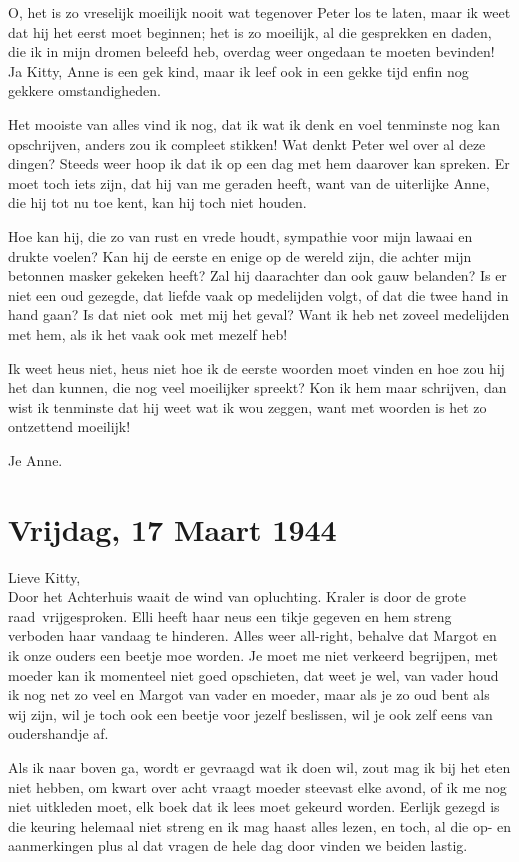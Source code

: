 \documentclass{book}
\begin{document}
O, het is zo vreselijk moeilijk nooit wat tegenover Peter los te laten, maar ik
weet dat hij het eerst moet beginnen; het is zo moeilijk, al die gesprekken en
daden, die ik in mijn dromen beleefd heb, overdag weer ongedaan te moeten
bevinden! Ja Kitty, Anne is een gek kind, maar ik leef ook in een gekke tijd
enfin nog gekkere omstandigheden.

Het mooiste van alles vind ik nog, dat ik wat ik denk en voel tenminste nog kan
opschrijven, anders zou ik compleet stikken! Wat denkt Peter wel over al deze
dingen? Steeds weer hoop ik dat ik op een dag met hem daarover kan spreken. Er
moet toch iets zijn, dat hij van me geraden heeft, want van de uiterlijke Anne,
die hij tot nu toe kent, kan hij toch niet houden.

Hoe kan hij, die zo van rust en vrede houdt, sympathie voor mijn lawaai en
drukte voelen? Kan hij de eerste en enige op de wereld zijn, die achter mijn
betonnen masker gekeken heeft? Zal hij daarachter dan ook gauw belanden? Is er
niet een oud gezegde, dat liefde vaak op medelijden volgt, of dat die twee hand
in hand gaan? Is dat niet ook~met mij het geval? Want ik heb net zoveel
medelijden met hem, als ik het vaak ook met mezelf heb!

Ik weet heus niet, heus niet hoe ik de eerste woorden moet vinden en hoe zou hij
het dan kunnen, die nog veel moeilijker spreekt? Kon ik hem maar schrijven, dan
wist ik tenminste dat hij weet wat ik wou zeggen, want met woorden is het zo
ontzettend moeilijk!

Je Anne.

\section*{Vrijdag, 17 Maart 1944}

Lieve Kitty,\\
Door het Achterhuis waait de wind van opluchting. Kraler is door
de grote raad~vrijgesproken. Elli heeft haar neus een tikje gegeven en hem
streng verboden haar vandaag te hinderen. Alles weer all-right, behalve dat
Margot en ik onze ouders een beetje moe worden.  Je moet me niet verkeerd
begrijpen, met moeder kan ik momenteel niet goed opschieten, dat weet je wel,
van vader houd ik nog net zo veel en Margot van vader en moeder, maar als je zo
oud bent als wij zijn, wil je toch ook een beetje voor jezelf beslissen, wil je
ook zelf eens van oudershandje af.

Als ik naar boven ga, wordt er gevraagd wat ik doen wil, zout mag ik bij het
eten niet hebben, om kwart over acht vraagt moeder steevast elke avond, of ik me
nog niet uitkleden moet, elk boek dat ik lees moet gekeurd worden. Eerlijk
gezegd is die keuring helemaal niet streng en ik mag haast alles lezen, en toch,
al die op- en aanmerkingen plus al dat vragen de hele dag door vinden we beiden
lastig.
\end{document}
